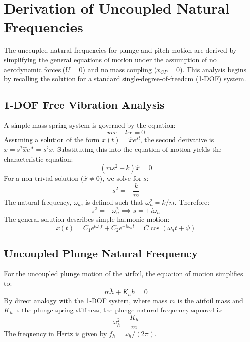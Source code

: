 \documentclass{article}
\begin{document}
\newpage
\appendix
\section{Derivation of Uncoupled Natural Frequencies}

The uncoupled natural frequencies for plunge and pitch motion are derived by simplifying the general equations of motion under the assumption of no aerodynamic forces ($U=0$) and no mass coupling ($x_{CP}=0$). This analysis begins by recalling the solution for a standard single-degree-of-freedom (1-DOF) system.

\subsection{1-DOF Free Vibration Analysis}
A simple mass-spring system is governed by the equation:
\begin{equation}
m\ddot{x} + kx = 0
\label{eq:1dof_equation}
\end{equation}
Assuming a solution of the form $x(t) = \hat{x}e^{st}$, the second derivative is $\ddot{x} = s^2\hat{x}e^{st} = s^2x$. Substituting this into the equation of motion yields the characteristic equation:
\begin{equation}
(ms^2 + k)\hat{x} = 0
\label{eq:1dof_characteristic}
\end{equation}
For a non-trivial solution ($\hat{x} \neq 0$), we solve for $s$:
\begin{equation}
s^2 = -\frac{k}{m}
\label{eq:1dof_s_squared}
\end{equation}
The natural frequency, $\omega_n$, is defined such that $\omega_n^2 = k/m$. Therefore:
\begin{equation}
s^2 = -\omega_n^2 \implies s = \pm i\omega_n
\label{eq:1dof_eigenvalues}
\end{equation}
The general solution describes simple harmonic motion:
\begin{equation}
x(t) = C_1 e^{i\omega_n t} + C_2 e^{-i\omega_n t} = C \cos(\omega_n t + \psi)
\label{eq:1dof_solution}
\end{equation}

\subsection{Uncoupled Plunge Natural Frequency}
For the uncoupled plunge motion of the airfoil, the equation of motion simplifies to:
\begin{equation}
m\ddot{h} + K_h h = 0
\label{eq:plunge_uncoupled}
\end{equation}
By direct analogy with the 1-DOF system, where mass $m$ is the airfoil mass and $K_h$ is the plunge spring stiffness, the plunge natural frequency squared is:
\begin{equation}
\omega_h^2 = \frac{K_h}{m}
\label{eq:plunge_natural_freq}
\end{equation}
The frequency in Hertz is given by $f_h = \omega_h / (2\pi)$.
\end{document}
